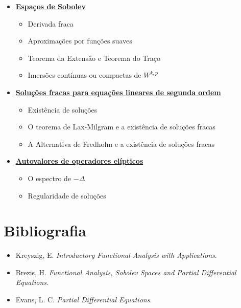 \begin{itemize}
\begin{itemize}
  \end{itemize}
  \item \underline{\textbf{ Espaços de Sobolev}}
  \begin{itemize}
    \item Derivada fraca
    \item Aproximações por funções suaves
    \item Teorema da Extensão e Teorema do Traço
    \item Imersões contínuas ou compactas de $W^{k,p}$
  \end{itemize}
  \item \underline{\textbf{Soluções fracas para equações lineares de segunda ordem}}
  \begin{itemize}
    \item Existência de soluções
    \item O teorema de Lax-Milgram e a existência de soluções fracas
    \item A Alternativa de Fredholm e a existência de soluções fracas
  \end{itemize}
  \item \underline{\textbf{Autovalores de operadores elípticos}}
  \begin{itemize}
    \item O espectro de $-\Delta$
    \item Regularidade de soluções
  \end{itemize}
\end{itemize}



\section*{Bibliografia}
\begin{itemize}
  \item \label{kreyz} Kreyszig, E. \textit{Introductory Functional Analysis with Applications}.
  \item \label{brez} Brezis, H. \textit{Functional Analysis, Sobolev Spaces and Partial Differential Equations}.
  \item \label{evans} Evans, L. C. \textit{Partial Differential Equations}.
\end{itemize}



